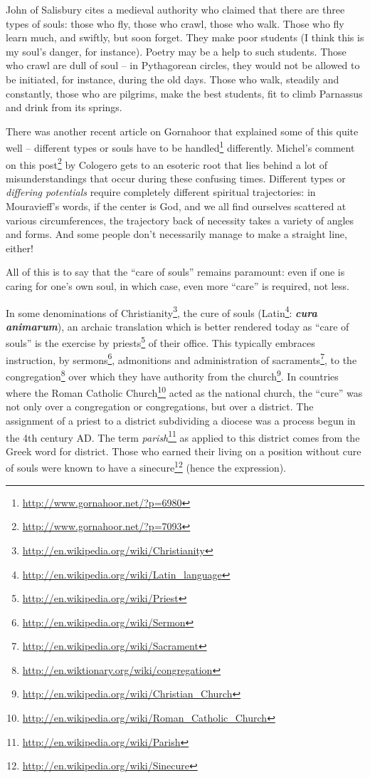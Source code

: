 John of Salisbury cites a medieval authority who claimed that there are three types of souls: those who fly, those who crawl, those who walk. Those who fly learn much, and swiftly, but soon forget. They make poor students (I think this is my soul's danger, for instance). Poetry may be a help to such students. Those who crawl are dull of soul -- in Pythagorean circles, they would not be allowed to be initiated, for instance, during the old days. Those who walk, steadily and constantly, those who are pilgrims, make the best students, fit to climb Parnassus and drink from its springs.

There was another recent article on Gornahoor that explained some of this quite well -- different types or souls have to be handled\footnote{\url{http://www.gornahoor.net/?p=6980}} differently. Michel's comment on this post\footnote{\url{http://www.gornahoor.net/?p=7093}} by Cologero gets to an esoteric root that lies behind a lot of misunderstandings that occur during these confusing times. Different types or \emph{differing potentials} require completely different spiritual trajectories: in Mouravieff's words, if the center is God, and we all find ourselves scattered at various circumferences, the trajectory back of necessity takes a variety of angles and forms. And some people don't necessarily manage to make a straight line, either!

All of this is to say that the ``care of souls'' remains paramount: even if one is caring for one's own soul, in which case, even more ``care'' is required, not less.

\begin{quotex}
In some denominations of Christianity\footnote{\url{http://en.wikipedia.org/wiki/Christianity}}, the cure of souls (Latin\footnote{\url{http://en.wikipedia.org/wiki/Latin_language}}: \textbf{\emph{cura animarum}}), an archaic translation which is better rendered today as ``care of souls'' is the exercise by priests\footnote{\url{http://en.wikipedia.org/wiki/Priest}} of their office. This typically embraces instruction, by sermons\footnote{\url{http://en.wikipedia.org/wiki/Sermon}}, admonitions and administration of sacraments\footnote{\url{http://en.wikipedia.org/wiki/Sacrament}}, to the congregation\footnote{\url{http://en.wiktionary.org/wiki/congregation}} over which they have authority from the church\footnote{\url{http://en.wikipedia.org/wiki/Christian_Church}}. In countries where the Roman Catholic Church\footnote{\url{http://en.wikipedia.org/wiki/Roman_Catholic_Church}} acted as the national church, the ``cure'' was not only over a congregation or congregations, but over a district. The assignment of a priest to a district subdividing a diocese was a process begun in the 4th century AD. The term \emph{parish}\footnote{\url{http://en.wikipedia.org/wiki/Parish}} as applied to this district comes from the Greek word for district. Those who earned their living on a position without cure of souls were known to have a sinecure\footnote{\url{http://en.wikipedia.org/wiki/Sinecure}} (hence the expression).
\end{quotex}


